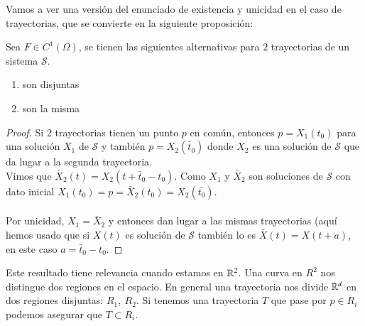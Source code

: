 Vamos a ver una versión del enunciado de existencia y unicidad en el caso de trayectorias, que se convierte en la siguiente proposición:
\begin{pro}
    Sea $F\in C^1(\Omega)$, se tienen las siguientes alternativas para $2$ trayectorias de un sistema $\mathcal{S}$.
    \begin{enumerate}
        \item son disjuntas
        \item son la misma
    \end{enumerate}
\end{pro}
\begin{proof}
    Si $2$ trayectorias tienen un punto $p$ en común, entonces $p = X_1(t_0)$ para una solución $X_1$ de $\mathcal{S}$ y también $p = X_2(\bar{t}_0)$ donde $X_2$ es una solución de $\mathcal{S}$ que da lugar a la segunda trayectoria.\\
    Vimos que $\bar{X}_2(t) = X_2(t + \bar{t}_0 - t_0)$. Como $X_1$ y $\bar{X}_2$ son soluciones de $\mathcal{S}$ con dato inicial $X_1(t_0) = p = \bar{X}_2(t_0) = X_2(\bar{t_0})$.\\\\
    Por unicidad, $X_1 = \bar{X}_2$ y entonces dan lugar a las mismas trayectorias (aquí hemos usado que si $X(t)$ es solución de $\mathcal{S}$ también lo es $\bar{X}(t) = X(t+a)$, en este caso $a = \bar{t}_0 - t_0$.
\end{proof}
\begin{obs}
    Este resultado tiene relevancia cuando estamos en $\mathbb{R}^2$. Una curva en $R^2$ nos distingue dos regiones en el espacio. En general una trayectoria nos divide $\mathbb{R}^d$ en dos regiones disjuntas: $R_1,\ R_2$. Si tenemos una trayectoria $T$ que pase por $p \in R_i$ podemos asegurar que $T \subset R_i$.
\end{obs}
